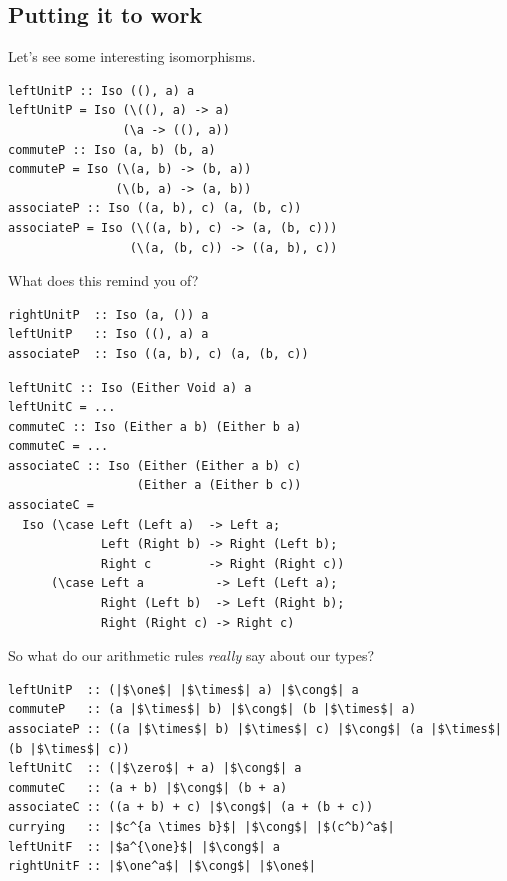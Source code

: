 \documentclass[tikz]{beamer}
\newcommand{\zero}{\bm{\mathbb{0}}}
\newcommand{\one}{\bm{\mathbb{1}}}
\theoremstyle{definition}
\begin{document}
\subsection{Putting it to work}
\begin{frame}[fragile]
Let's see some interesting isomorphisms.

\begin{verbatim}
leftUnitP :: Iso ((), a) a
leftUnitP = Iso (\((), a) -> a)
                (\a -> ((), a))
commuteP :: Iso (a, b) (b, a)
commuteP = Iso (\(a, b) -> (b, a))
               (\(b, a) -> (a, b))
associateP :: Iso ((a, b), c) (a, (b, c))
associateP = Iso (\((a, b), c) -> (a, (b, c)))
                 (\(a, (b, c)) -> ((a, b), c))
\end{verbatim}
\end{frame}
\begin{frame}[fragile]
What does this remind you of?
\begin{verbatim}
rightUnitP  :: Iso (a, ()) a
leftUnitP   :: Iso ((), a) a
associateP  :: Iso ((a, b), c) (a, (b, c))
\end{verbatim}
\end{frame}
\begin{frame}[fragile]
\begin{verbatim}
leftUnitC :: Iso (Either Void a) a
leftUnitC = ...
commuteC :: Iso (Either a b) (Either b a)
commuteC = ...
associateC :: Iso (Either (Either a b) c)
                  (Either a (Either b c))
associateC =
  Iso (\case Left (Left a)  -> Left a;
             Left (Right b) -> Right (Left b);
             Right c        -> Right (Right c))
      (\case Left a          -> Left (Left a);
             Right (Left b)  -> Left (Right b);
             Right (Right c) -> Right c)
\end{verbatim}
\end{frame}

\frame
{ 
	So what do our arithmetic rules \textit{really} say about our types?
}

\begin{frame}[fragile]
\begin{verbatim}
leftUnitP  :: (|$\one$| |$\times$| a) |$\cong$| a
commuteP   :: (a |$\times$| b) |$\cong$| (b |$\times$| a)
associateP :: ((a |$\times$| b) |$\times$| c) |$\cong$| (a |$\times$| (b |$\times$| c))
leftUnitC  :: (|$\zero$| + a) |$\cong$| a
commuteC   :: (a + b) |$\cong$| (b + a)
associateC :: ((a + b) + c) |$\cong$| (a + (b + c))
currying   :: |$c^{a \times b}$| |$\cong$| |$(c^b)^a$|
leftUnitF  :: |$a^{\one}$| |$\cong$| a
rightUnitF :: |$\one^a$| |$\cong$| |$\one$|
\end{verbatim}
\end{frame}
\end{document}
